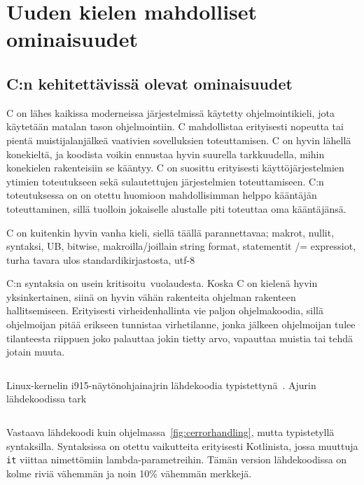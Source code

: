 \section{Uuden kielen mahdolliset ominaisuudet}

\subsection{C:n kehitettävissä olevat ominaisuudet}

C on lähes kaikissa moderneissa järjestelmissä käytetty ohjelmointikieli, jota
käytetään matalan tason ohjelmointiin. C mahdollistaa erityisesti nopeutta tai
pientä muistijalanjälkeä vaativien sovelluksien toteuttamisen. C on hyvin
lähellä konekieltä, ja koodista voikin ennustaa hyvin suurella tarkkuudella,
mihin konekielen rakenteisiin se kääntyy. C on suosittu erityisesti
käyttöjärjestelmien ytimien toteutukseen sekä sulautettujen järjestelmien
toteuttamiseen. C:n toteutuksessa on on otettu huomioon mahdollisimman helppo
kääntäjän toteuttaminen\citationneeded, sillä tuolloin jokaiselle alustalle
piti toteuttaa oma kääntäjänsä.

C on kuitenkin hyvin vanha kieli, siellä täällä parannettavaa; makrot, nullit,
syntaksi, UB, bitwise, makroilla/joillain string format, statementit /=
expressiot, turha tavara ulos standardikirjastosta, utf-8

C:n syntaksia on usein kritisoitu\citationneeded~vuolaudesta. Koska C on
kielenä hyvin yksinkertainen, siinä on hyvin vähän rakenteita ohjelman
rakenteen hallitsemiseen. Erityisesti virheidenhallinta vie paljon
ohjelmakoodia, sillä ohjelmoijan pitää erikseen tunnistaa virhetilanne,
jonka jälkeen ohjelmoijan tulee tilanteesta riippuen joko palauttaa jokin
tietty arvo, vapauttaa muistia tai tehdä jotain muuta.

\begin{listing}[ht!]
    \inputminted{C}{c-error-handling.c}
    \caption{Linux-kernelin i915-näytönohjainajrin lähdekoodia
    typistettynä~\citep[i915\_perf.c, funktio i915\_oa\_stream\_init]{i915debugfs}. Ajurin lähdekoodissa tark}
    \label{fig:cerrorhandling}
\end{listing}

\begin{listing}[ht!]
    \inputminted{Kotlin}{c-error-handling-maybe.kt}
    \caption{Vastaava lähdekoodi kuin ohjelmassa~\ref{fig:cerrorhandling},
    mutta typistetyllä syntaksilla. Syntaksissa on otettu vaikutteita
    erityisesti Kotlinista, jossa muuttuja \texttt{it} viittaa nimettömiin
    lambda-parametreihin. Tämän version lähdekoodissa on kolme riviä vähemmän
    ja noin 10\% vähemmän merkkejä.}
\end{listing}



